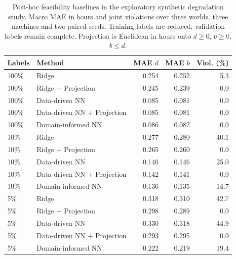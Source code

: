 \begin{table}[t]
\centering
\caption{Post-hoc feasibility baselines in the exploratory synthetic degradation study. Macro MAE in hours and joint violations over three worlds, three machines and two paired seeds. Training labels are reduced; validation labels remain complete. Projection is Euclidean in hours onto $d\geq0$, $b\geq0$, $b\leq d$.}
\label{tab:projection_baselines}
\begin{tabular}{llrrr}
\toprule
Labels & Method & MAE $d$ & MAE $b$ & Viol. (\%) \\
\midrule
100\% & Ridge & 0.254 & 0.252 & 5.3 \\
100\% & Ridge + Projection & 0.245 & 0.239 & 0.0 \\
100\% & Data-driven NN & 0.085 & 0.081 & 0.0 \\
100\% & Data-driven NN + Projection & 0.085 & 0.081 & 0.0 \\
100\% & Domain-informed NN & 0.086 & 0.082 & 0.0 \\
\midrule
10\% & Ridge & 0.277 & 0.280 & 40.1 \\
10\% & Ridge + Projection & 0.265 & 0.260 & 0.0 \\
10\% & Data-driven NN & 0.146 & 0.146 & 25.0 \\
10\% & Data-driven NN + Projection & 0.142 & 0.141 & 0.0 \\
10\% & Domain-informed NN & 0.136 & 0.135 & 14.7 \\
\midrule
5\% & Ridge & 0.318 & 0.310 & 42.7 \\
5\% & Ridge + Projection & 0.298 & 0.289 & 0.0 \\
5\% & Data-driven NN & 0.330 & 0.318 & 44.9 \\
5\% & Data-driven NN + Projection & 0.293 & 0.295 & 0.0 \\
5\% & Domain-informed NN & 0.222 & 0.219 & 19.4 \\
\bottomrule
\end{tabular}
\end{table}
